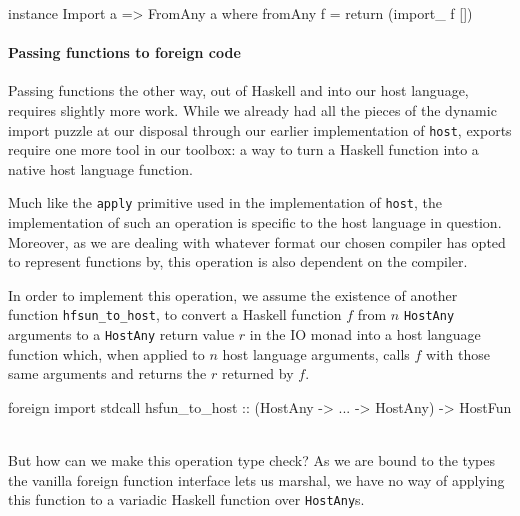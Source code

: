 \documentclass[preprint]{sigplanconf}
\begin{document}
\begin{code}
instance Import a => FromAny a where
  fromAny f = return (import_ f [])
\end{code}

\paragraph{Passing functions to foreign code}
Passing functions the other way, out of Haskell and into our host language,
requires slightly more work. While we already had all the pieces of the
dynamic import puzzle at our disposal through our earlier implementation of
\lstinline!host!, exports require one more tool in our toolbox: a way to turn
a Haskell function into a native host language function.

Much like the \lstinline!apply! primitive used in the implementation of
\lstinline!host!, the implementation of such an operation is specific to the
host language in question. Moreover, as we are dealing with whatever format
our chosen compiler has opted to represent functions by, this operation is also
dependent on the compiler.

In order to implement this operation, we assume the existence of another
function \lstinline!hfsun_to_host!, to convert a Haskell function $f$ from $n$
\lstinline!HostAny! arguments to a \lstinline!HostAny! return value $r$ in the
IO monad into a host language function which, when applied to $n$ host
language arguments, calls $f$ with those same arguments and returns the $r$
returned by $f$.\\
\begin{code}
foreign import stdcall hsfun_to_host
  :: (HostAny -> ... -> HostAny) -> HostFun
\end{code}\\
But how can we make this operation type check?
As we are bound to the types the vanilla foreign function interface lets us
marshal, we have no way of applying this function to a variadic Haskell
function over \lstinline!HostAny!s.
\end{document}

